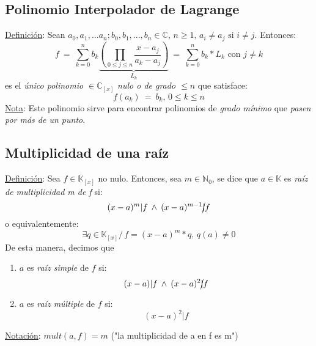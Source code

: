 \documentclass{article}
\newcommand{\lands}{\:\land\:}                          %
\newcommand{\comma}{,\,}                                %
\newcommand{\tq}{/\,}                                   %
\newcommand{\eq}{\:=\:}                                 %
\newcommand{\naturales}{\mathbb{N}}                     %
\newcommand{\complejos}{\mathbb{C}}                     %
\newcommand{\cuerpo}{\mathbb{K}}                        %
\begin{document}
\subsection{Polinomio Interpolador de Lagrange}
\underline{Definición}: Sean $a_0,a_1,...a_n;b_0,b_1,...,b_n \in \complejos \comma n \geq 1 \comma a_i \neq a_j \text{ si } i \neq j$. Entonces:
\begin{equation*}
    f\eq \sum_{k=0} ^n b_k \underbrace{(\prod_{0 \leq j \leq n} \frac{x-a_j}{a_k-a_j})}_{L_k} \eq \sum_{k=0}^n b_k * L_k \text{ con $j \neq k$}
\end{equation*}
es el \emph{único polinomio $\in \complejos_{[x]}$ nulo o de grado $\leq n$} que satisface:
\begin{equation*}
    f(a_k)\eq b_k \comma 0 \leq k \leq n
\end{equation*}
\underline{Nota}: Este polinomio sirve para encontrar polinomios de \emph{grado mínimo} que \emph{pasen por más de un punto}.

\subsection{Multiplicidad de una raíz}
\underline{Definición}: Sea $f \in \cuerpo_{[x]}$ no nulo. Entonces, sea $m \in \naturales_0$, se dice que $a \in \cuerpo$ es \emph{raíz de multiplicidad m de f} si:
\begin{equation*}
    (x-a)^m|f \lands (x-a)^{m-1}\cancel{|}f
\end{equation*}
o equivalentemente:
\begin{equation*}
    \exists q \in \cuerpo_{[x]} \tq f = (x-a)^m * q \comma q(a)\neq 0
\end{equation*}
De esta manera, decimos que
\begin{enumerate}
    \item $a$ es \emph{raíz simple} de $f$ si:
    \begin{equation*}
        (x-a)|f \lands (x-a)^2 \cancel{|} f
    \end{equation*}
    \item $a$ es \emph{raíz múltiple} de $f$ si:
    \begin{equation*}
        (x-a)^2 | f
    \end{equation*}
\end{enumerate}
\underline{Notación}: $mult(a,f)=m$ ("la multiplicidad de a en f es m")
\end{document}
